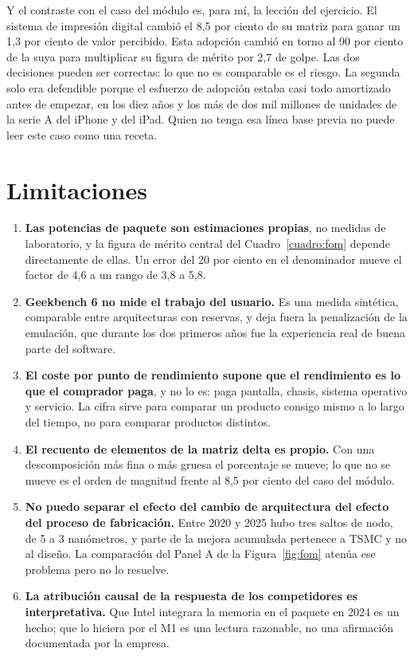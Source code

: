 \documentclass[11pt,letterpaper]{article}
\begin{document}
Y el contraste con el caso del módulo es, para mí, la lección del ejercicio.
El sistema de impresión digital cambió el 8,5 por ciento de su matriz para
ganar un 1,3 por ciento de valor percibido. Esta adopción cambió en torno al
90 por ciento de la suya para multiplicar su figura de mérito por 2,7 de
golpe. Las dos decisiones pueden ser correctas: lo que no es comparable es el
riesgo. La segunda solo era defendible porque el esfuerzo de adopción estaba
casi todo amortizado antes de empezar, en los diez años y los más de dos mil
millones de unidades de la serie A del iPhone y del iPad. Quien no tenga esa
línea base previa no puede leer este caso como una receta.

\section{Limitaciones}

\begin{enumerate}
\item \textbf{Las potencias de paquete son estimaciones propias}, no medidas
  de laboratorio, y la figura de mérito central del Cuadro~\ref{cuadro:fom}
  depende directamente de ellas. Un error del 20 por ciento en el denominador
  mueve el factor de 4,6 a un rango de 3,8 a 5,8.
\item \textbf{Geekbench 6 no mide el trabajo del usuario.} Es una medida
  sintética, comparable entre arquitecturas con reservas, y deja fuera la
  penalización de la emulación, que durante los dos primeros años fue la
  experiencia real de buena parte del software.
\item \textbf{El coste por punto de rendimiento supone que el rendimiento es
  lo que el comprador paga}, y no lo es: paga pantalla, chasis, sistema
  operativo y servicio. La cifra sirve para comparar un producto consigo mismo
  a lo largo del tiempo, no para comparar productos distintos.
\item \textbf{El recuento de elementos de la matriz delta es propio.} Con una
  descomposición más fina o más gruesa el porcentaje se mueve; lo que no se
  mueve es el orden de magnitud frente al 8,5 por ciento del caso del módulo.
\item \textbf{No puedo separar el efecto del cambio de arquitectura del
  efecto del proceso de fabricación.} Entre 2020 y 2025 hubo tres saltos de
  nodo, de 5 a 3 nanómetros, y parte de la mejora acumulada pertenece a TSMC y
  no al diseño. La comparación del Panel A de la Figura~\ref{fig:fom} atenúa
  ese problema pero no lo resuelve.
\item \textbf{La atribución causal de la respuesta de los competidores es
  interpretativa.} Que Intel integrara la memoria en el paquete en 2024 es un
  hecho; que lo hiciera por el M1 es una lectura razonable, no una afirmación
  documentada por la empresa.
\end{enumerate}

\printbibliography
\end{document}
